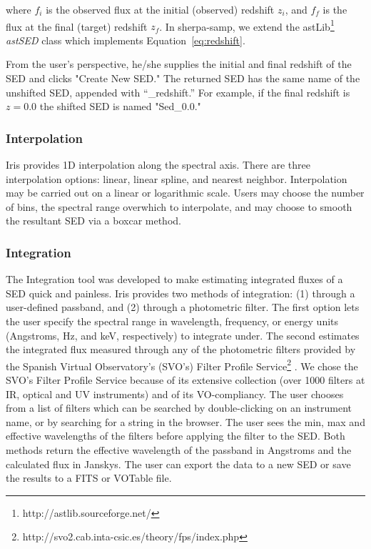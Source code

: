 \documentclass[5p]{elsarticle}
\begin{document}
where $f_i$ is the observed flux at the initial (observed) redshift $z_i$, and $f_f$ is the flux at the final (target) redshift $z_f$. In sherpa-samp, we extend the astLib\footnote{http://astlib.sourceforge.net/} \textit{astSED} class which implements Equation~\ref{eq:redshift}. 

From the user's perspective, he/she supplies the initial and final redshift of the SED and clicks "Create New SED." The returned SED has the same name of the unshifted SED, appended with ``\_redshift.'' For example, if the final redshift is \(z=0.0\) the shifted SED is named "Sed\_0.0."

\subsubsection{Interpolation}
Iris provides 1D interpolation along the spectral axis. There are three interpolation options: linear, linear spline, and nearest neighbor. Interpolation may be carried out on a linear or logarithmic scale. Users may choose the number of bins, the spectral range overwhich to interpolate, and may choose to smooth the resultant SED via a boxcar method.

\subsubsection{Integration}
The Integration tool was developed to make estimating integrated fluxes of a SED quick and painless. Iris provides two methods of integration: (1) through a user-defined passband, and (2) through a photometric filter. The first option lets the user specify the spectral range in wavelength, frequency, or energy units (Angstroms, Hz, and keV, respectively) to integrate under. The second estimates the integrated flux measured through any of the photometric filters provided by the Spanish Virtual Observatory's (SVO's) Filter Profile Service\footnote{http://svo2.cab.inta-csic.es/theory/fps/index.php} \citep{2013arXiv1312.3249S}. We chose the SVO's Filter Profile Service because of its extensive collection (over 1000 filters at IR, optical and UV instruments) and of its VO-compliancy. The user chooses from a list of filters which can be searched by double-clicking on an instrument name, or by searching for a string in the browser. The user sees the min, max and effective wavelengths of the filters before applying the filter to the SED.
Both methods return the effective wavelength of the passband in Angstroms and the calculated flux in Janskys. The user can export the data to a new SED or save the results to a FITS or VOTable file.
\end{document}
